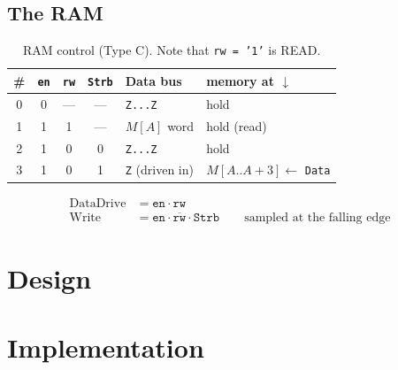 \subsection*{The RAM}

\begin{table}[htbp]
\centering
\caption{RAM control (Type C). Note that \texttt{rw = '1'} is READ.}
\label{tab:lab09-ram}
\begin{tabular}{cccc||ll}
\toprule
\# & \texttt{en} & \texttt{rw} & \texttt{Strb} & Data bus & memory at $\downarrow$ \\
\midrule
0 & 0 & --- & --- & \texttt{Z...Z} & hold \\
1 & 1 & 1 & --- & $M[A]$ word & hold (read) \\
2 & 1 & 0 & 0 & \texttt{Z...Z} & hold \\
3 & 1 & 0 & 1 & \texttt{Z} (driven in) & $M[A..A{+}3] \leftarrow$ \texttt{Data} \\
\bottomrule
\end{tabular}
\end{table}

\begin{align*}
\text{DataDrive} &= \texttt{en} \cdot \texttt{rw} \\
\text{Write} &= \texttt{en} \cdot \overline{\texttt{rw}} \cdot \texttt{Strb}
   \qquad \text{sampled at the falling edge}
\end{align*}

\section{Design}

\section{Implementation}



